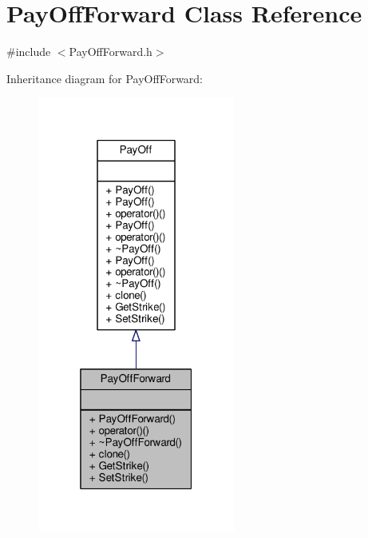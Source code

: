 \hypertarget{classPayOffForward}{}\section{Pay\+Off\+Forward Class Reference}
\label{classPayOffForward}


{\ttfamily \#include $<$Pay\+Off\+Forward.\+h$>$}



Inheritance diagram for Pay\+Off\+Forward\+:
\nopagebreak
\begin{figure}[H]
\begin{center}
\leavevmode
\includegraphics[width=184pt]{classPayOffForward__inherit__graph}
\end{center}
\end{figure}


